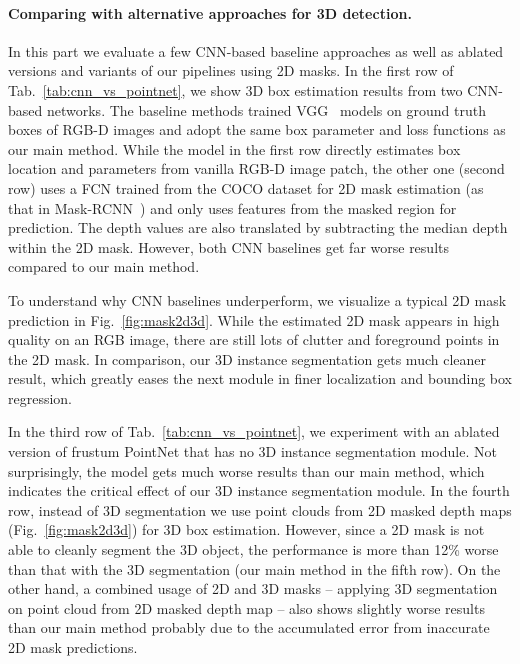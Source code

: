 \paragraph{Comparing with alternative approaches for 3D detection.} In this part we evaluate a few CNN-based baseline approaches as well as ablated versions and variants of our pipelines using 2D masks.
In the first row of Tab.~\ref{tab:cnn_vs_pointnet}, we show 3D box estimation results from two CNN-based networks. The baseline methods trained VGG~\cite{simonyan2014very} models on ground truth boxes of RGB-D images and adopt the same box parameter and loss functions as our main method. While the model in the first row directly estimates box location and parameters from vanilla RGB-D image patch, the other one (second row) uses a FCN trained from the COCO dataset for 2D mask estimation (as that in Mask-RCNN~\cite{he2017mask}) and only uses features from the masked region for prediction. The depth values are also translated by subtracting the median depth within the 2D mask. However, both CNN baselines get far worse results compared to our main method.

To understand why CNN baselines underperform, we visualize a typical 2D mask prediction in Fig.~\ref{fig:mask2d3d}. While the estimated 2D mask appears in high quality on an RGB image, there are still lots of clutter and foreground points in the 2D mask. %
In comparison, our 3D instance segmentation gets much cleaner result, which greatly eases the next module in finer localization and bounding box regression.


In the third row of Tab.~\ref{tab:cnn_vs_pointnet}, we experiment with an ablated version of frustum PointNet that has no 3D instance segmentation module. Not surprisingly, the model gets much worse results than our main method, which indicates the critical effect of our 3D instance segmentation module. In the fourth row, instead of 3D segmentation we use point clouds from 2D masked depth maps (Fig.~\ref{fig:mask2d3d}) for 3D box estimation. However, since a 2D mask is not able to cleanly segment the 3D object, the performance is more than 12\% worse than that with the 3D segmentation (our main method in the fifth row). On the other hand, a combined usage of 2D and 3D masks -- applying 3D segmentation on point cloud from 2D masked depth map -- also shows slightly worse results than our main method probably due to the accumulated error from inaccurate 2D mask predictions.

